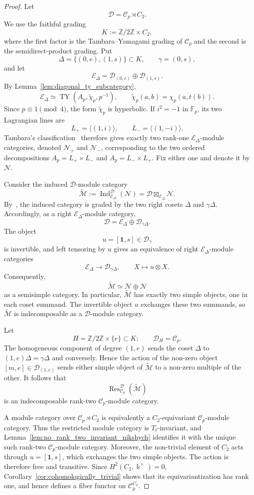 \documentclass[12pt]{amsart}
\theoremstyle{plain}
\theoremstyle{definition} %
\theoremstyle{remark} %
\newcommand{\ku}{{\Bbbk}} %
\newcommand{\cC}{\mathcal{C}}
\newcommand{\cD}{\mathcal{D}}
\newcommand{\cE}{\mathcal{E}}
\newcommand{\cM}{\mathcal{M}}
\newcommand{\cN}{\mathcal{N}}
\newcommand{\TY}{\operatorname{TY}}
\DeclareMathOperator{\Ind}{Ind}
\DeclareMathOperator{\Res}{Res}
\begin{document}
\begin{proof}
Let
\[
\cD=\cC_p\rtimes C_2.
\]
We use the faithful grading
\[
K:=\mathbb Z/2\mathbb Z\times C_2,
\]
where the first factor is the Tambara--Yamagami grading of $\cC_p$ and the
second is the semidirect-product grading. Put
\[
\Delta=\{(0,e),(1,s)\}\subset K,
\qquad
\gamma=(0,s),
\]
and let
\[
\cE_\Delta=\cD_{(0,e)}\oplus\cD_{(1,s)}.
\]
By Lemma~\ref{lem:diagonal_ty_subcategory},
\[
\cE_\Delta\simeq
\TY(A_p,\widetilde\chi_p,p^{-1}),
\qquad
\widetilde\chi_p(a,b)=\chi_p(a,t(b)).
\]
Since $p\equiv1\pmod4$, the form $\widetilde\chi_p$ is hyperbolic. If
$i^2=-1$ in $\mathbb F_p$, its two Lagrangian lines are
\[
L_+=\langle(1,i)\rangle,
\qquad
L_-=\langle(1,-i)\rangle.
\]
Tambara's classification~\cite[Propositions~4.1 and~4.2]{T00} therefore gives
exactly two rank-one $\cE_\Delta$-module categories, denoted $\cN_+$ and
$\cN_-$, corresponding to the two ordered decompositions
$A_p=L_+\times L_-$ and $A_p=L_-\times L_+$. Fix either one and denote it by
$\cN$.

Consider the induced $\cD$-module category
\[
\widetilde{\cM}
:=
\Ind_{\cE_\Delta}^{\cD}(\cN)
=
\cD\boxtimes_{\cE_\Delta}\cN.
\]
By~\cite[Propositions~3.5 and~3.7]{Gal12}, the induced category is
graded by the two right cosets $\Delta$ and $\gamma\Delta$. Accordingly,
as a right $\cE_\Delta$-module category,
\[
\cD=\cE_\Delta\oplus\cD_{\gamma\Delta}.
\]
The object
\[
u=[\mathbf1,s]\in\cD_\gamma
\]
is invertible, and left tensoring by $u$ gives an equivalence of right
$\cE_\Delta$-module categories
\[
\cE_\Delta\longrightarrow\cD_{\gamma\Delta},
\qquad
X\longmapsto u\otimes X.
\]
Consequently,
\[
\widetilde{\cM}
\simeq
\cN\oplus\cN
\]
as a semisimple category. In particular, $\widetilde{\cM}$ has exactly two
simple objects, one in each coset summand. The invertible object $u$ exchanges
these two summands, so $\widetilde{\cM}$ is indecomposable as a $\cD$-module
category.

Let
\[
H=\mathbb Z/2\mathbb Z\times\{e\}\subset K;
\qquad
\cD_H=\cC_p.
\]
The homogeneous component of degree $(1,e)$ sends the coset $\Delta$ to
$(1,e)\Delta=\gamma\Delta$ and conversely. Hence the action of the non-zero
object $[m,e]\in\cD_{(1,e)}$ sends either simple object of
$\widetilde{\cM}$ to a non-zero multiple of the other. It follows that
\[
\Res_{\cC_p}^{\cD}(\widetilde{\cM})
\]
is an indecomposable rank-two $\cC_p$-module category.

A module category over $\cC_p\rtimes C_2$ is equivalently a $C_2$-equivariant
$\cC_p$-module category. Thus the restricted module category is
$T_t$-invariant, and Lemma~\ref{lem:no_rank_two_invariant_nikshych} identifies
it with the unique such rank-two $\cC_p$-module category. Moreover, the
non-trivial element of $C_2$ acts through $u=[\mathbf1,s]$, which exchanges
the two simple objects. The action is therefore free and transitive. Since
$H^2(C_2,\ku^\times)=0$, Corollary~\ref{cor:cohomologically_trivial} shows
that its equivariantization has rank one, and hence defines a fiber functor on
$\cC_p^{C_2}$.


\end{proof}
\end{document}
